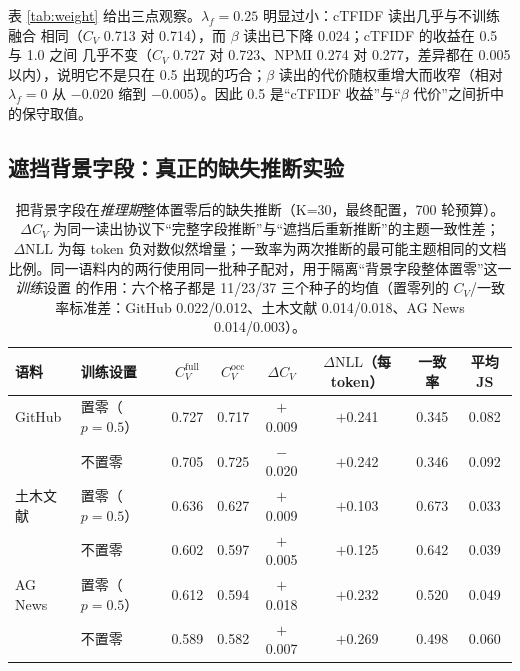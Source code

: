 \documentclass[11pt]{ctexart}
\begin{document}
表 \ref{tab:weight} 给出三点观察。$\lambda_f=0.25$ 明显过小：cTFIDF 读出几乎与不训练融合
相同（$C_V$ 0.713 对 0.714），而 $\beta$ 读出已下降 0.024；cTFIDF 的收益在 0.5 与 1.0 之间
几乎不变（$C_V$ 0.727 对 0.723、NPMI 0.274 对 0.277，差异都在 0.005 以内），说明它不是只在
0.5 出现的巧合；$\beta$ 读出的代价随权重增大而收窄（相对 $\lambda_f=0$ 从 $-0.020$ 缩到
$-0.005$）。因此 0.5 是“cTFIDF 收益”与“$\beta$ 代价”之间折中的保守取值。

\subsection{遮挡背景字段：真正的缺失推断实验}


\begin{table}[t]
\centering
\caption{把背景字段在\emph{推理期}整体置零后的缺失推断（K=30，最终配置，700 轮预算）。
$\Delta C_V$ 为同一读出协议下“完整字段推断”与“遮挡后重新推断”的主题一致性差；
$\Delta\mathrm{NLL}$ 为每 token 负对数似然增量；一致率为两次推断的最可能主题相同的文档
比例。同一语料内的两行使用同一批种子配对，用于隔离“背景字段整体置零”这一\emph{训练}设置
的作用：六个格子都是 11/23/37 三个种子的均值（置零列的 $C_V$/一致率标准差：GitHub
0.022/0.012、土木文献 0.014/0.018、AG News 0.014/0.003）。}
\label{tab:occlusion}
\small
\setlength{\tabcolsep}{4pt}
\begin{tabular}{llcccccc}
\toprule
语料 & 训练设置 & $C_V^{\mathrm{full}}$ & $C_V^{\mathrm{occ}}$ & $\Delta C_V$
 & $\Delta\mathrm{NLL}$（每 token） & 一致率 & 平均 JS \\
\midrule
GitHub & 置零（$p=0.5$） & 0.727 & 0.717 & $+$0.009 & $+$0.241 & 0.345 & 0.082 \\
       & 不置零 & 0.705 & 0.725 & $-$0.020 & $+$0.242 & 0.346 & 0.092 \\
\midrule
土木文献 & 置零（$p=0.5$） & 0.636 & 0.627 & $+$0.009 & $+$0.103 & 0.673 & 0.033 \\
        & 不置零 & 0.602 & 0.597 & $+$0.005 & $+$0.125 & 0.642 & 0.039 \\
\midrule
AG News & 置零（$p=0.5$） & 0.612 & 0.594 & $+$0.018 & $+$0.232 & 0.520 & 0.049 \\
        & 不置零 & 0.589 & 0.582 & $+$0.007 & $+$0.269 & 0.498 & 0.060 \\
\bottomrule
\end{tabular}
\end{table}
\end{document}

